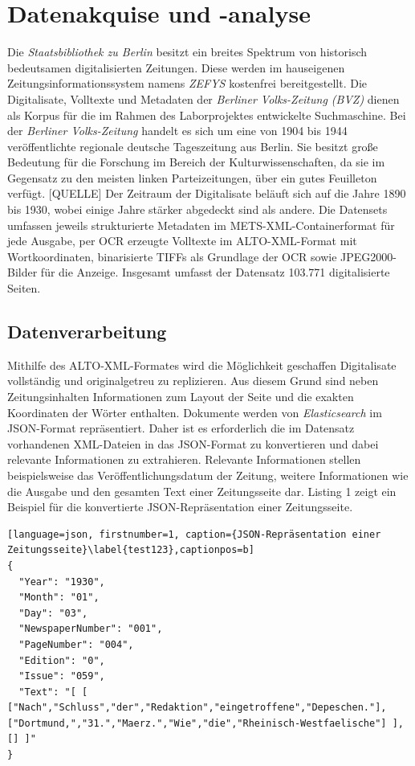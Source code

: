 \documentclass[11pt,a4paper, halfparskip]{scrartcl}
\begin{document}
\section{Datenakquise und -analyse}

Die \textit{Staatsbibliothek zu Berlin} besitzt ein breites Spektrum von historisch bedeutsamen digitalisierten Zeitungen.
Diese werden im hauseigenen Zeitungsinformationssystem namens \textit{ZEFYS} kostenfrei bereitgestellt.
Die Digitalisate, Volltexte und Metadaten der \textit{Berliner Volks-Zeitung (BVZ)} dienen als Korpus für die im Rahmen des Laborprojektes entwickelte Suchmaschine.
Bei der \textit{Berliner Volks-Zeitung} handelt es sich um eine von 1904 bis 1944 veröffentlichte regionale deutsche Tageszeitung aus Berlin.
Sie besitzt große Bedeutung für die Forschung im Bereich der Kulturwissenschaften, da sie im Gegensatz zu den meisten linken Parteizeitungen, über ein gutes Feuilleton verfügt. [QUELLE]
Der Zeitraum der Digitalisate beläuft sich auf die Jahre 1890 bis 1930, wobei einige Jahre stärker abgedeckt sind als andere.
Die Datensets umfassen jeweils strukturierte Metadaten im METS-XML-Containerformat für jede Ausgabe, per OCR erzeugte Volltexte im ALTO-XML-Format mit Wortkoordinaten, binarisierte TIFFs als Grundlage der OCR sowie JPEG2000-Bilder für die Anzeige.
Insgesamt umfasst der Datensatz 103.771 digitalisierte Seiten. 

\subsection{Datenverarbeitung}

Mithilfe des ALTO-XML-Formates wird die Möglichkeit geschaffen Digitalisate vollständig und originalgetreu zu replizieren. 
Aus diesem Grund sind neben Zeitungsinhalten Informationen zum Layout der Seite und die exakten Koordinaten der Wörter enthalten.
Dokumente werden von \textit{Elasticsearch} im JSON-Format repräsentiert.
Daher ist es erforderlich die im Datensatz vorhandenen XML-Dateien in das JSON-Format zu konvertieren und dabei relevante Informationen zu extrahieren.
Relevante Informationen stellen beispielsweise das Veröffentlichungsdatum der Zeitung, weitere Informationen wie die Ausgabe und den gesamten Text einer Zeitungsseite dar.
Listing 1 zeigt ein Beispiel für die konvertierte JSON-Repräsentation einer Zeitungsseite.

\begin{lstlisting}[language=json, firstnumber=1, caption={JSON-Repräsentation einer Zeitungsseite}\label{test123},captionpos=b]
{
  "Year": "1930",
  "Month": "01",
  "Day": "03",
  "NewspaperNumber": "001",
  "PageNumber": "004",
  "Edition": "0",
  "Issue": "059",
  "Text": "[ [ ["Nach","Schluss","der","Redaktion","eingetroffene","Depeschen."], ["Dortmund,","31.","Maerz.","Wie","die","Rheinisch-Westfaelische"] ], [] ]"
}
\end{lstlisting}
\end{document}
